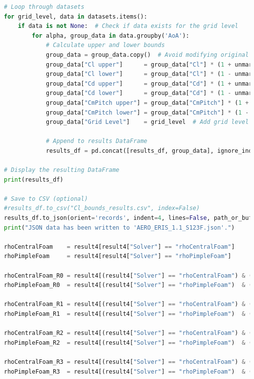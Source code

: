 \documentclass[12pt]{article}
\begin{document}
\begin{lstlisting}[language=Python, caption=Python script used to post-process numerical solutions. To report bugs email to: lorenzo.campoli@gspace.com, label=lst:pp]
# Loop through datasets
for grid_level, data in datasets.items():
    if data is not None:  # Check if data exists for the grid level
        for alpha, group_data in data.groupby('AoA'):
            # Calculate upper and lower bounds
            group_data = group_data.copy()  # Avoid modifying original DataFrame
            group_data["Cl upper"]      = group_data["Cl"] * (1 + unmargin)
            group_data["Cl lower"]      = group_data["Cl"] * (1 - unmargin)
            group_data["Cd upper"]      = group_data["Cd"] * (1 + unmargin)
            group_data["Cd lower"]      = group_data["Cd"] * (1 - unmargin)
            group_data["CmPitch upper"] = group_data["CmPitch"] * (1 + unmargin)
            group_data["CmPitch lower"] = group_data["CmPitch"] * (1 - unmargin)
            group_data["Grid Level"]    = grid_level  # Add grid level as a column

            # Append to results DataFrame
            results_df = pd.concat([results_df, group_data], ignore_index=True)

# Display the resulting DataFrame
print(results_df)

# Save to CSV (optional)
#results_df.to_csv("Cl_bounds_results.csv", index=False)
results_df.to_json(orient='records', indent=4, lines=False, path_or_buf='AERO_ERIS_1.1_S123F.json')
print("JSON data has been written to 'AERO_ERIS_1.1_S123F.json'.")

rhoCentralFoam    = result4[result4["Solver"] == "rhoCentralFoam"]
rhoPimpleFoam     = result4[result4["Solver"] == "rhoPimpleFoam"]

rhoCentralFoam_R0 = result4[(result4["Solver"] == "rhoCentralFoam") & (result4["GridLevel"] == "R0")]
rhoPimpleFoam_R0  = result4[(result4["Solver"] == "rhoPimpleFoam")  & (result4["GridLevel"] == "R0")]

rhoCentralFoam_R1 = result4[(result4["Solver"] == "rhoCentralFoam") & (result4["GridLevel"] == "R1")]
rhoPimpleFoam_R1  = result4[(result4["Solver"] == "rhoPimpleFoam")  & (result4["GridLevel"] == "R1")]

rhoCentralFoam_R2 = result4[(result4["Solver"] == "rhoCentralFoam") & (result4["GridLevel"] == "R2")]
rhoPimpleFoam_R2  = result4[(result4["Solver"] == "rhoPimpleFoam")  & (result4["GridLevel"] == "R2")]

rhoCentralFoam_R3 = result4[(result4["Solver"] == "rhoCentralFoam") & (result4["GridLevel"] == "R3")]
rhoPimpleFoam_R3  = result4[(result4["Solver"] == "rhoPimpleFoam")  & (result4["GridLevel"] == "R3")]


\end{lstlisting}
\end{document}
